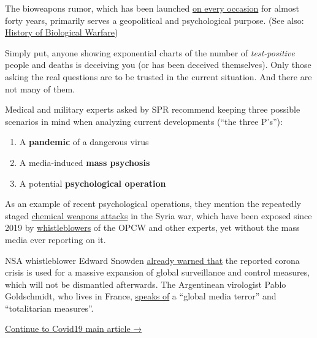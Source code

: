The bioweapons rumor, which has been launched
\href{https://www.wilsoncenter.org/blog-post/operation-denver-kgb-and-stasi-disinformation-regarding-aids}{on
every occasion} for almost forty years, primarily serves a geopolitical
and psychological purpose. (See also:
\href{https://www.emedicinehealth.com/biological_warfare/article_em.htm}{History
of Biological Warfare})

Simply put, anyone showing exponential charts of the number of
\emph{test-positive} people and deaths is deceiving you (or has been
deceived themselves). Only those asking the real questions are to be
trusted in the current situation. And there are not many of them.

Medical and military experts asked by SPR recommend keeping three
possible scenarios in mind when analyzing current developments (``the
three P's''):

\begin{enumerate}
\def\labelenumi{\arabic{enumi}.}
\tightlist
\item
  A \textbf{pandemic} of a dangerous virus
\item
  A media-induced \textbf{mass psychosis}
\item
  A potential \textbf{psychological operation}
\end{enumerate}

As an example of recent psychological operations, they mention the
repeatedly staged
\href{https://www.globalresearch.ca/the-bbc-saving-syrias-children-documentary-staged-events-fake-video-footage/5470158}{chemical
weapons attacks} in the Syria war, which have been exposed since 2019 by
\href{https://thegrayzone.com/2020/01/22/ian-henderson-opcw-whistleblower-un-no-chemical-attack-douma-syria/}{whistleblowers}
of the OPCW and other experts, yet without the mass media ever reporting
on it.

NSA whistleblower Edward Snowden
\href{https://www.youtube.com/watch?v=9we6t2nObbw}{already warned that}
the reported corona crisis is used for a massive expansion of global
surveillance and control measures, which will not be dismantled
afterwards. The Argentinean virologist Pablo Goldschmidt, who lives in
France,
\href{https://www.infobae.com/coronavirus/2020/03/28/para-un-prestigioso-cientifico-argentino-el-coronavirus-no-merece-que-el-planeta-este-en-un-estado-de-parate-total/}{speaks
of} a ``global media terror'' and ``totalitarian measures''.

\href{https://swprs.org/a-swiss-doctor-on-covid-19/}{Continue to Covid19
main article →}

